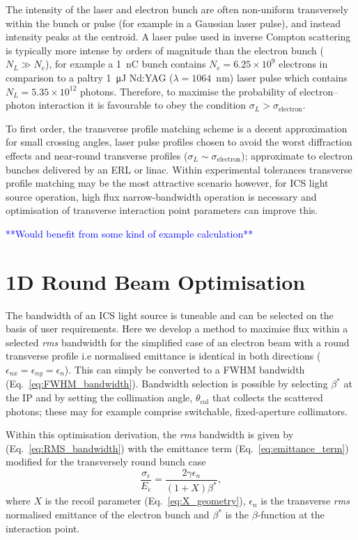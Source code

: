 \documentclass[../main.tex]{subfiles}
\begin{document}
The intensity of the laser and electron bunch are often non-uniform transversely within the bunch or pulse (for example in a Gaussian laser pulse), and instead intensity peaks at the centroid. A laser pulse used in inverse Compton scattering is typically more intense by orders of magnitude than the electron bunch ($N_{L} \gg N_{e}$), for example a 1~\si{\nano\coulomb} bunch contains $N_{e} = 6.25\times 10^{9}$ electrons in comparison to a paltry 1~\si{\micro\joule} Nd:YAG ($\lambda = 1064$~\si{\nano\meter}) laser pulse which contains $N_{L} = 5.35\times 10^{12}$ photons. Therefore, to maximise the probability of electron--photon interaction it is favourable to obey the condition $\sigma_{L} > \sigma_{\mathrm{electron}}$.

To first order, the transverse profile matching scheme is a decent approximation for small crossing angles, laser pulse profiles chosen to avoid the worst diffraction effects and near-round transverse profiles ($\sigma_{L}\sim\sigma_{\mathrm{electron}}$); approximate to electron bunches delivered by an ERL or linac. Within experimental tolerances transverse profile matching may be the most attractive scenario however, for ICS light source operation, high flux narrow-bandwidth operation is necessary and optimisation of transverse interaction point parameters can improve this. 

\textcolor{blue}{**Would benefit from some kind of example calculation**}

\section{1D Round Beam Optimisation}
\label{sec:RB_optimisation}

The bandwidth of an ICS light source is tuneable and can be selected on the basis of user requirements. Here we develop a method to maximise flux within a selected \textit{rms} bandwidth for the simplified case of an electron beam with a round transverse profile i.e normalised emittance is identical in both directions ($\epsilon_{nx} = \epsilon_{ny} = \epsilon_{n}$). This can simply be converted to a FWHM bandwidth (Eq.~\ref{eq:FWHM_bandwidth}). Bandwidth selection is possible by selecting $\beta^{*}$ at the IP and by setting the collimation angle, $\theta_{\mathrm{col}}$ that collects the scattered photons; these may for example comprise switchable, fixed-aperture collimators.

Within this optimisation derivation, the \textit{rms} bandwidth is given by (Eq.~\ref{eq:RMS_bandwidth}) with the emittance term (Eq.~\ref{eq:emittance_term}) modified for the transversely round bunch case
\begin{equation}
\frac{\sigma_{\epsilon}}{E_{\epsilon}} = \frac{2\gamma\epsilon_{n}}{\left(1+X\right)\beta^{*}},
\label{eq:emittance_term_round_beam}    
\end{equation}
where $X$ is the recoil parameter (Eq.~\ref{eq:X_geometry}), $\epsilon_{n}$ is the transverse \textit{rms} normalised emittance of the electron bunch and $\beta^{*}$ is the $\beta$-function at the interaction point.
\end{document}
